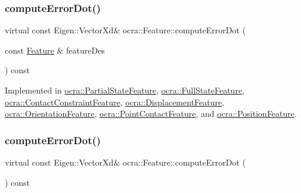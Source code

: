 \hypertarget{classocra_1_1Feature_ac714181e1bb25f878349e299c4ba8c00}{}\label{classocra_1_1Feature_ac714181e1bb25f878349e299c4ba8c00} 
\subsubsection{\texorpdfstring{compute\+Error\+Dot()}{computeErrorDot()}\hspace{0.1cm}{\footnotesize\ttfamily [1/2]}}
{\footnotesize\ttfamily virtual const Eigen\+::\+Vector\+Xd\& ocra\+::\+Feature\+::compute\+Error\+Dot (\begin{DoxyParamCaption}\item[{const \hyperlink{classocra_1_1Feature}{Feature} \&}]{feature\+Des }\end{DoxyParamCaption}) const\hspace{0.3cm}{\ttfamily [pure virtual]}}



Implemented in \hyperlink{classocra_1_1PartialStateFeature_a5abaab0eb99ac60f0150c4137960ee14}{ocra\+::\+Partial\+State\+Feature}, \hyperlink{classocra_1_1FullStateFeature_a0d3e5b76bdcae8e06df07c7f525ad690}{ocra\+::\+Full\+State\+Feature}, \hyperlink{classocra_1_1ContactConstraintFeature_a0be2debba15230d160957c15eb5afa97}{ocra\+::\+Contact\+Constraint\+Feature}, \hyperlink{classocra_1_1DisplacementFeature_afd5e272957274c46a6331c2a3d3324df}{ocra\+::\+Displacement\+Feature}, \hyperlink{classocra_1_1OrientationFeature_a49fd73d3b8dd5eb2f26c32c3c4440644}{ocra\+::\+Orientation\+Feature}, \hyperlink{classocra_1_1PointContactFeature_a73527a8f55f6a693d975b7a4bf3bf422}{ocra\+::\+Point\+Contact\+Feature}, and \hyperlink{classocra_1_1PositionFeature_a76887c9a378e9527e0afe6afad1e782b}{ocra\+::\+Position\+Feature}.

\hypertarget{classocra_1_1Feature_a01a4870418ba87d5b41d8f917c1255fc}{}\label{classocra_1_1Feature_a01a4870418ba87d5b41d8f917c1255fc} 
\subsubsection{\texorpdfstring{compute\+Error\+Dot()}{computeErrorDot()}\hspace{0.1cm}{\footnotesize\ttfamily [2/2]}}
{\footnotesize\ttfamily virtual const Eigen\+::\+Vector\+Xd\& ocra\+::\+Feature\+::compute\+Error\+Dot (\begin{DoxyParamCaption}{ }\end{DoxyParamCaption}) const\hspace{0.3cm}{\ttfamily [pure virtual]}}



